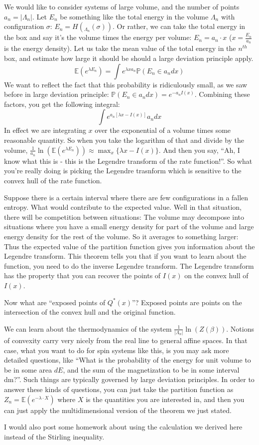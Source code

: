 We would like to consider systems of large volume, and the number of points $a_n = |\Lambda_n|$. Let $E_n$ be something like the total energy in the volume $\Lambda_n$ with configuration $\sigma$: $E_n = H(_{\Lambda_n}(\sigma))$. Or rather, we can take the total energy in the box and say it's the volume times the energy per volume: $E_n = a_n \cdot x$ ($x = \frac{E_n}{a_n}$ is the energy density). Let us take the mean value of the total energy in the $n^{th}$ box, and estimate how large it should be should a large deviation principle apply. 
\[
\mathbb{E} \left(e^{\lambda E_n}\right) = \int e^{\lambda x a_n} \mathbb{P}(E_n \in a_n dx)
\] 
We want to reflect the fact that this probability is ridiculously small, as we saw before in large deviation principle: $\mathbb{P}(E_n \in a_ndx) = e^{-a_nI(x)}$. Combining these factors, you get the following integral: 
\[
\int e^{a_n\left[ \lambda x - I(x)\right]}a_n dx
\]
In effect we are integrating $x$ over the exponential of a volume times some reasonable quantity. So when you take the logarithm of that and divide by the volume, $\frac{1}{a_n}\ln(\mathbb{E}(e^{\lambda E_n})) \approx \max_x \{\lambda x - I(x)\}$. And then you say, ``Ah, I know what this is - this is the Legendre transform of the rate function!''. So what you're really doing is picking the Legendre trasnform which is sensitive to the convex hull of the rate function. 

Suppose there is a certain interval where there are few configurations in a fallen entropy. What would contribute to the expected value. Well in that situation, there will be competition between situations: The volume may decompose into situations where you have a small energy density for part of the volume and large energy density for the rest of the volume. So it averages to something larger: Thus the expected value of the partition function gives you information about the Legendre transform. This theorem tells you that if you want to learn about the function, you need to do the inverse Legendre transform. The Legendre transform has the property that you can recover the points of $I(x)$ on the convex hull of $I(x)$. 

Now what are ``exposed points of $Q^*(x)$''? Exposed points are points on the intersection of the convex hull and the original function. 

We can learn about the thermodynamics of the system $\frac{1}{|\Lambda_n|}\ln(Z(\beta))$. Notions of convexity carry very nicely from the real line to general affine spaces. In that case, what you want to do for spin systems like this, is you may ask more detailed questions, like ``What is the probability of the energy for unit volume to be in some area $dE$, and the sum of the magnetization to be in some interval dm?''. Such things are typically governed by large deviation principles. 
In order to answer these kinds of questions, you can just take the partition function as $Z_n = \mathbb{E}(e^{-\lambda \cdot X})$ where $X$ is the quantities you are interested in, and then you can just apply the multidimensional version of the theorem we just stated. 

I would also post some homework about using the calculation we derived here instead of the Stirling inequality. 



